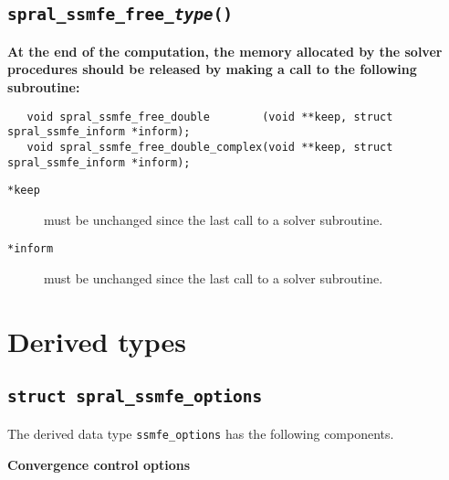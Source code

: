 \subsection{\texttt{spral\_ssmfe\_free\_\textit{type}()}}

{\bf
At the end of the computation, the memory 
allocated by the solver procedures
should be released
by making a call to the following subroutine:
}

\begin{verbatim}
   void spral_ssmfe_free_double        (void **keep, struct spral_ssmfe_inform *inform);
   void spral_ssmfe_free_double_complex(void **keep, struct spral_ssmfe_inform *inform);
\end{verbatim}

\begin{description}
%
\item[\texttt{*keep}] must be unchanged since the last call to a solver subroutine.
%
\item[\texttt{*inform}] must be unchanged since the last call to a solver subroutine.
%
\end{description}

\section{Derived types}

\subsection{\texttt{struct spral\_ssmfe\_options}}
\label{ssmfe:type:options}

The derived data type
{\tt ssmfe\_options}
has the following components.

\bigskip
\noindent
{\bf Convergence control options}

